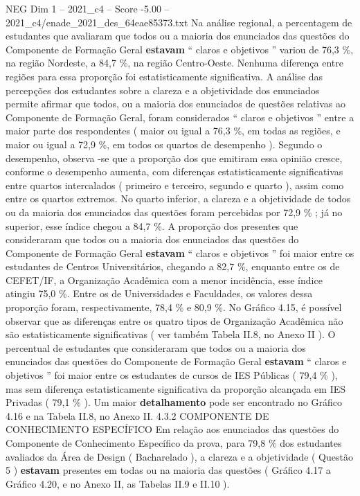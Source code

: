 \begin{textsample}{NEG Dim 1 – 2021\_c4 – Score -5.00 – 2021\_c4/enade\_2021\_des\_64eae85373.txt}
Na análise regional, a percentagem de estudantes que avaliaram que todos ou a maioria dos enunciados das questões do Componente de Formação Geral \textbf{estavam} “ claros e objetivos ” variou de 76,3 \%, na região Nordeste, a 84,7 \%, na região Centro-Oeste.
Nenhuma diferença entre regiões para essa proporção foi estatisticamente significativa.
A análise das percepções dos estudantes sobre a clareza e a objetividade dos enunciados permite afirmar que todos, ou a maioria dos enunciados de questões relativas ao Componente de Formação Geral, foram considerados “ claros e objetivos ” entre a maior parte dos respondentes ( maior ou igual a 76,3 \%, em todas as regiões, e maior ou igual a 72,9 \%, em todos os quartos de desempenho ).
Segundo o desempenho, observa -se que a proporção dos que emitiram essa opinião cresce, conforme o desempenho aumenta, com diferenças estatisticamente significativas entre quartos intercalados ( primeiro e terceiro, segundo e quarto ), assim como entre os quartos extremos.
No quarto inferior, a clareza e a objetividade de todos ou da maioria dos enunciados das questões foram percebidas por 72,9 \% ; já no superior, esse índice chegou a 84,7 \%.
A proporção dos presentes que consideraram que todos ou a maioria dos enunciados das questões do Componente de Formação Geral \textbf{estavam} “ claros e objetivos ” foi maior entre os estudantes de Centros Universitários, chegando a 82,7 \%, enquanto entre os de CEFET/IF, a Organização Acadêmica com a menor incidência, esse índice atingiu 75,0 \%.
Entre os de Universidades e Faculdades, os valores dessa proporção foram, respectivamente, 78,4 \% e 80,9 \%.
No Gráfico 4.15, é possível observar que as diferenças entre os quatro tipos de Organização Acadêmica não são estatisticamente significativas ( ver também Tabela II.8, no Anexo II ).
O percentual de estudantes que consideraram que todos ou a maioria dos enunciados das questões do Componente de Formação Geral \textbf{estavam} “ claros e objetivos ” foi maior entre os estudantes de cursos de IES Públicas ( 79,4 \% ), mas sem diferença estatisticamente significativa da proporção alcançada em IES Privadas ( 79,1 \% ).
Um maior \textbf{detalhamento} pode ser encontrado no Gráfico 4.16 e na Tabela II.8, no Anexo II. 4.3.2 COMPONENTE DE CONHECIMENTO ESPECÍFICO Em relação aos enunciados das questões do Componente de Conhecimento Específico da prova, para 79,8 \% dos estudantes avaliados da Área de Design ( Bacharelado ), a clareza e a objetividade ( Questão 5 ) \textbf{estavam} presentes em todas ou na maioria das questões ( Gráfico 4.17 a Gráfico 4.20, e no Anexo II, as Tabelas II.9 e II.10 ).

\end{textsample}
